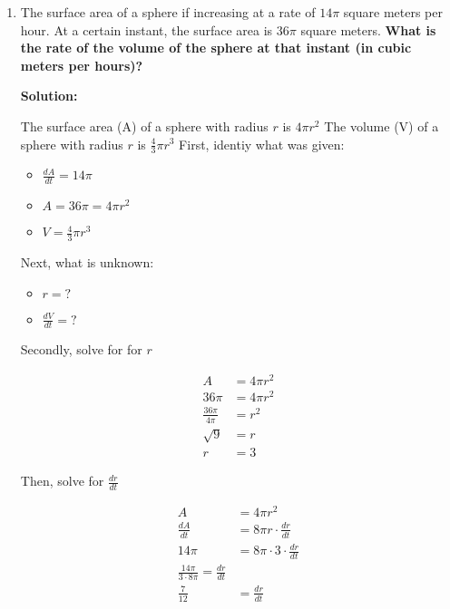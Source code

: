 \documentclass[12pt]{article}
\begin{document}
\begin{enumerate}
            \item The surface area of a sphere if increasing at a rate of $14\pi$ square meters per hour. 
            At a certain instant, the surface area is $36\pi$ square meters. \textbf{What is the rate of the 
            volume of the sphere at that instant (in cubic meters per hours)?}

            \textbf{Solution: }

            The surface area (A) of a sphere with radius $r$ is $4\pi r^2$ 
            The volume (V) of a sphere with radius $r$ is $\frac{4}{3}\pi r^3$
            First, identiy what was given:

            \begin{itemize}
                \item $\frac{dA}{dt} = 14\pi$
                \item $A = 36\pi = 4\pi r^2$
                \item $V = \frac{4}{3}\pi r^3$
            \end{itemize}

            Next, what is unknown:

            \begin{itemize}
                \item $r = ?$
                \item $\frac{dV}{dt} = ?$
            \end{itemize}

            Secondly, solve for for $r$

            \[
                \begin{aligned}
                    A &= 4\pi r^2 \\
                    36\pi &= 4\pi r^2 \\
                    \frac{36\pi}{4\pi} &= r^2 \\
                    \sqrt{9} &= r \\
                    r &= 3
                \end{aligned}
            \]

            Then, solve for $\frac{dr}{dt}$

            \[
                \begin{aligned}
                    A &= 4\pi r^2 \\
                    \frac{dA}{dt} &= 8\pi r \cdot \frac{dr}{dt} \\
                    14\pi &= 8\pi \cdot 3 \cdot \frac{dr}{dt} \\
                    \frac{14\pi}{3\cdot 8\pi} = \frac{dr}{dt} \\
                    \frac{7}{12} &= \frac{dr}{dt} 
                \end{aligned}    
            \]


\end{enumerate}
\end{document}

